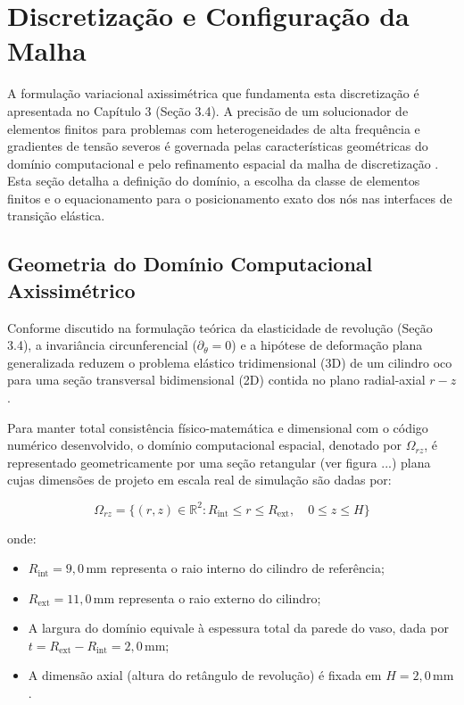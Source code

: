 \section{Discretização e Configuração da Malha}\label{sec:discretizacao_malha}


A formulação variacional axissimétrica que fundamenta esta discretização é apresentada no Capítulo 3 (Seção 3.4).
A precisão de um solucionador de elementos finitos para problemas com heterogeneidades de alta frequência e gradientes de tensão severos é governada pelas características geométricas do domínio computacional e pelo refinamento espacial da malha de discretização \cite{Sadd2009}. Esta seção detalha a definição do domínio, a escolha da classe de elementos finitos e o equacionamento para o posicionamento exato dos nós nas interfaces de transição elástica.

\subsection{Geometria do Domínio Computacional Axissimétrico}

Conforme discutido na formulação teórica da elasticidade de revolução (Seção 3.4), a invariância circunferencial ($\partial_{\theta} = 0$) e a hipótese de deformação plana generalizada reduzem o problema elástico tridimensional (3D) de um cilindro oco para uma seção transversal bidimensional (2D) contida no plano radial-axial $r-z$ \cite{Timoshenko_1951}.

Para manter total consistência físico-matemática e dimensional com o código numérico desenvolvido, o domínio computacional espacial, denotado por $\Omega_{rz}$, é representado geometricamente por uma seção retangular (ver figura ...)  plana cujas dimensões de projeto em escala real de simulação são dadas por:


\begin{equation}
  \Omega_{rz} = \{ (r, z) \in \mathbb{R}^2 : R_{\text{int}} \le r \le R_{\text{ext}} , \quad 0 \le z \le H \}
  \label{eq:dominio_mef}
\end{equation}

onde:

\begin{itemize}
  \item $R_{\text{int}} = 9,0 \, \text{mm}$ representa o raio interno do cilindro de referência;
  \item $R_{\text{ext}} = 11,0 \, \text{mm}$ representa o raio externo do cilindro;
  \item A largura do domínio equivale à espessura total da parede do vaso, dada por $t = R_{\text{ext}} - R_{\text{int}} = 2,0 \, \text{mm}$;
  \item A dimensão axial (altura do retângulo de revolução) é fixada em $H = 2,0 \, \text{mm}$.
\end{itemize}

